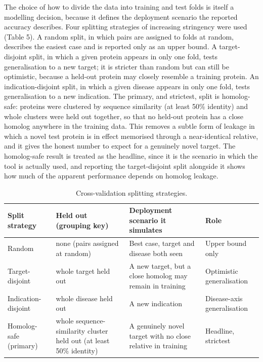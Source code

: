 \documentclass[11pt,twocolumn]{article}
\begin{document}
The choice of how to divide the data into training and test folds is itself a modelling decision, because it defines the deployment scenario the reported accuracy describes. Four splitting strategies of increasing stringency were used (Table 5). A random split, in which pairs are assigned to folds at random, describes the easiest case and is reported only as an upper bound. A target-disjoint split, in which a given protein appears in only one fold, tests generalisation to a new target; it is stricter than random but can still be optimistic, because a held-out protein may closely resemble a training protein. An indication-disjoint split, in which a given disease appears in only one fold, tests generalisation to a new indication. The primary, and strictest, split is homolog-safe: proteins were clustered by sequence similarity (at least 50\% identity) and whole clusters were held out together, so that no held-out protein has a close homolog anywhere in the training data. This removes a subtle form of leakage in which a novel test protein is in effect memorised through a near-identical relative, and it gives the honest number to expect for a genuinely novel target. The homolog-safe result is treated as the headline, since it is the scenario in which the tool is actually used, and reporting the target-disjoint split alongside it shows how much of the apparent performance depends on homolog leakage.

\begin{table}[t]
\centering
\caption{Cross-validation splitting strategies.}
\label{tab:5}
\footnotesize
\begin{tabular}{p{}p{}p{}p{}}
\toprule
Split strategy & Held out (grouping key) & Deployment scenario it simulates & Role \\
\midrule
Random & none (pairs assigned at random) & Best case, target and disease both seen & Upper bound only \\
Target-disjoint & whole target held out & A new target, but a close homolog may remain in training & Optimistic generalisation \\
Indication-disjoint & whole disease held out & A new indication & Disease-axis generalisation \\
Homolog-safe (primary) & whole sequence-similarity cluster held out (at least 50\% identity) & A genuinely novel target with no close relative in training & Headline, strictest \\
\bottomrule
\end{tabular}
\end{table}
\end{document}
